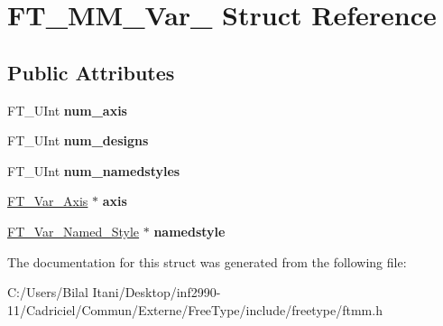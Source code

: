 \hypertarget{struct_f_t___m_m___var__}{}\section{F\+T\+\_\+\+M\+M\+\_\+\+Var\+\_\+ Struct Reference}
\label{struct_f_t___m_m___var__}
\subsection*{Public Attributes}
\begin{DoxyCompactItemize}
\item 
F\+T\+\_\+\+U\+Int {\bfseries num\+\_\+axis}\hypertarget{struct_f_t___m_m___var___acd32d4eb128f6fd9f6fde7da4c7b99bf}{}\label{struct_f_t___m_m___var___acd32d4eb128f6fd9f6fde7da4c7b99bf}

\item 
F\+T\+\_\+\+U\+Int {\bfseries num\+\_\+designs}\hypertarget{struct_f_t___m_m___var___a5109a6a20626d90ed44cd64363d29e92}{}\label{struct_f_t___m_m___var___a5109a6a20626d90ed44cd64363d29e92}

\item 
F\+T\+\_\+\+U\+Int {\bfseries num\+\_\+namedstyles}\hypertarget{struct_f_t___m_m___var___ac54bdd53447f4967b5d3b1a341a4bdff}{}\label{struct_f_t___m_m___var___ac54bdd53447f4967b5d3b1a341a4bdff}

\item 
\hyperlink{struct_f_t___var___axis__}{F\+T\+\_\+\+Var\+\_\+\+Axis} $\ast$ {\bfseries axis}\hypertarget{struct_f_t___m_m___var___a19cc7772e057dad1c4acd6e744328466}{}\label{struct_f_t___m_m___var___a19cc7772e057dad1c4acd6e744328466}

\item 
\hyperlink{struct_f_t___var___named___style__}{F\+T\+\_\+\+Var\+\_\+\+Named\+\_\+\+Style} $\ast$ {\bfseries namedstyle}\hypertarget{struct_f_t___m_m___var___acda1ec5211250ddc06ec090f695adabf}{}\label{struct_f_t___m_m___var___acda1ec5211250ddc06ec090f695adabf}

\end{DoxyCompactItemize}


The documentation for this struct was generated from the following file\+:\begin{DoxyCompactItemize}
\item 
C\+:/\+Users/\+Bilal Itani/\+Desktop/inf2990-\/11/\+Cadriciel/\+Commun/\+Externe/\+Free\+Type/include/freetype/ftmm.\+h\end{DoxyCompactItemize}
